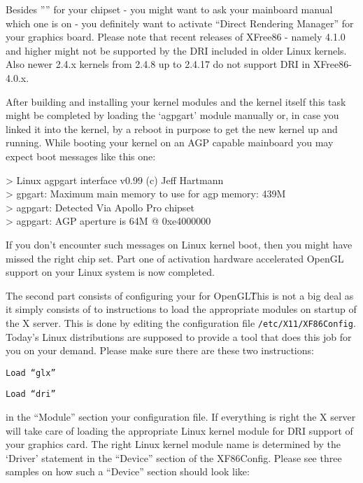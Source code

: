 Besides '''' for your chipset - you might want to ask
your mainboard manual which one is on - you definitely want to activate
``Direct Rendering Manager'' for your graphics board. Please note that
recent releases of XFree86 - namely 4.1.0 and higher might not be supported
by the DRI included in older Linux kernels. Also newer 2.4.x kernels from
2.4.8 up to 2.4.17 do not support DRI in XFree86-4.0.x.

After building and installing your kernel modules and the kernel itself this
task might be completed by loading the `agpgart' module manually or, in case
you linked it into the kernel, by a reboot in purpose to get the new kernel
up and running. While booting your kernel on an AGP capable mainboard you
may expect boot messages like this one:
\medskip

\begin{ttfamily}
\noindent
> Linux agpgart interface v0.99 (c) Jeff Hartmann\\
> gpgart: Maximum main memory to use for agp memory: 439M\\
> agpgart: Detected Via Apollo Pro chipset\\
> agpgart: AGP aperture is 64M @ 0xe4000000
\end{ttfamily}
\medskip

If you don't encounter such messages on Linux kernel boot, then you might
have missed the right chip set. Part one of activation hardware accelerated OpenGL support on your Linux system is now completed.

The second part consists of configuring your  for OpenGL\. This is
not a big deal as it simply consists of to instructions to load the
appropriate modules on startup of the X server.
This is done by editing the configuration file \texttt{/etc/X11/XF86Config}. Today's
Linux distributions are supposed to provide a tool that does this job for
you on your demand. Please make sure there are these two instructions:
\medskip


 \texttt{Load ``glx''}
 
 \texttt{Load ``dri''}
\medskip

\noindent
in the ``Module'' section your  configuration file. If everything is
right the X server will take care of loading the appropriate Linux kernel
module for DRI support of your graphics card. The right Linux kernel module
name is determined by the `Driver' statement in the ``Device'' section of the
XF86Config. Please see three samples on how such a ``Device'' section should
look like:
\medskip

